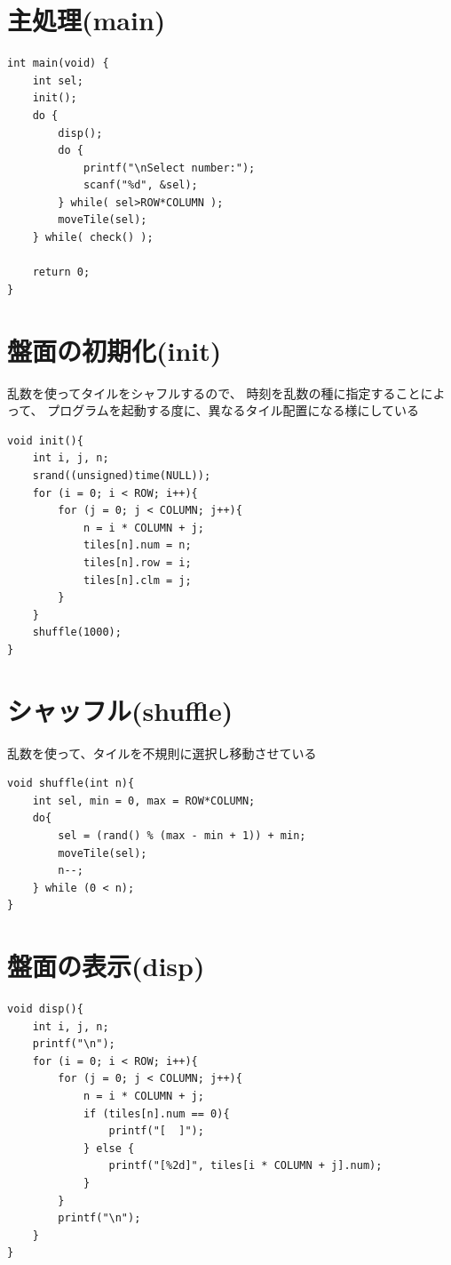 \documentclass[uplatex,a4paper,11pt,oneside,openany]{jsbook}
\begin{document}
\section{主処理(main)}

\begin{lstlisting}
int main(void) {
    int sel;
    init();
    do {
        disp();
        do {
            printf("\nSelect number:");
            scanf("%d", &sel);
        } while( sel>ROW*COLUMN );
        moveTile(sel);
    } while( check() );

    return 0;
}
\end{lstlisting}

\section{盤面の初期化(init)}

乱数を使ってタイルをシャフルするので、
時刻を乱数の種に指定することによって、
プログラムを起動する度に、異なるタイル配置になる様にしている

\begin{lstlisting}
void init(){
    int i, j, n;
    srand((unsigned)time(NULL));
    for (i = 0; i < ROW; i++){
        for (j = 0; j < COLUMN; j++){
            n = i * COLUMN + j;
            tiles[n].num = n;
            tiles[n].row = i;
            tiles[n].clm = j;
        }
    }
    shuffle(1000);
}
\end{lstlisting}

\section{シャッフル(shuffle)}

乱数を使って、タイルを不規則に選択し移動させている

\begin{lstlisting}
void shuffle(int n){
    int sel, min = 0, max = ROW*COLUMN;
    do{
        sel = (rand() % (max - min + 1)) + min;
        moveTile(sel);
        n--;
    } while (0 < n);
}
\end{lstlisting}

\newpage

\section{盤面の表示(disp)}

\begin{lstlisting}
void disp(){
    int i, j, n;
    printf("\n");
    for (i = 0; i < ROW; i++){
        for (j = 0; j < COLUMN; j++){
            n = i * COLUMN + j;
            if (tiles[n].num == 0){
                printf("[  ]");
            } else {
                printf("[%2d]", tiles[i * COLUMN + j].num);
            }
        }
        printf("\n");
    }
}
\end{lstlisting}
\end{document}
